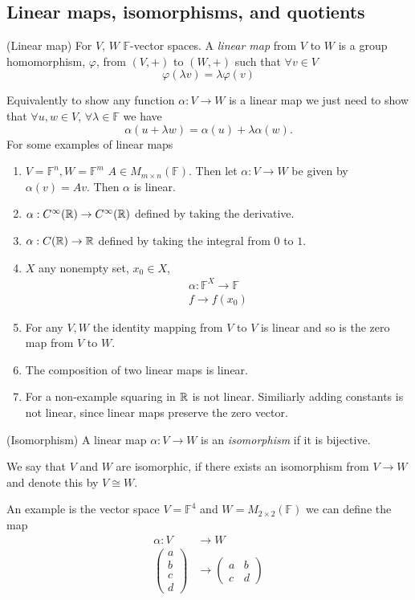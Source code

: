 \documentclass{article}
\newcommand{\F}{\mathbb{F}}
\begin{document}
\subsection{Linear maps, isomorphisms, and quotients}
\begin{definition}
	(Linear map) For $ V $, $ W $ $ \F $-vector spaces. A \textit{linear map} from $ V $ to $ W $ is a group homomorphism, $ \varphi $, from $ (V,+) $ to $ (W,+) $ such that $ \forall v\in V $
	\[
	  \varphi(\lambda v) = \lambda\varphi(v)
	\]
\end{definition}
Equivalently to show any function $\alpha: V\to W $ is a linear map we just need to show that $ \forall u,w\in V $, $ \forall \lambda \in\F $ we have
\[
  \alpha(u+\lambda w)=\alpha(u)+\lambda\alpha(w).
\]
For some examples of linear maps
\begin{enumerate}
	\item $ V=\F^n, W=\F^m $ $ A\in M_{m\times n}(\F) $. Then let $ \alpha:V\to W $ be given by $ \alpha(v)=Av $. Then $ \alpha $ is linear.
	\item $ \alpha:C^\infty(\mathbb{R})\to C^\infty(\mathbb{R}) $ defined by taking the derivative.
	\item $ \alpha: C(\mathbb{R})\to \mathbb{R} $ defined by taking the integral from $ 0 $ to $ 1 $.
	\item $ X $ any nonempty  set, $ x_0\in X $,
		\begin{align*}
		  \alpha:\F^X\to \F \\
		  f\to f(x_0)
		\end{align*}
	\item For any $ V,W $ the identity mapping from $ V $ to $ V $ is linear and so is the zero map from $ V $ to $ W $.
	\item The composition of two linear maps is linear.
	\item For a non-example squaring in $ \mathbb{R} $ is not linear. Similiarly adding constants is not linear, since linear maps preserve the zero vector.
\end{enumerate}
\begin{definition}
	(Isomorphism) A linear map $ \alpha:V\to W $ is an \textit{isomorphism} if it is bijective.\par
	We say that $ V $ and $ W $ are isomorphic, if there exists an isomorphism from $ V\to W $ and denote this by $ V\cong W $.
\end{definition}
An example is the vector space $ V=\F^4 $ and $ W=M_{2\times 2}(\F) $ we can define the map
\begin{align*}
	\alpha:V &\to W\\
	        \begin{pmatrix}
	         a\\b\\c\\d
	       \end{pmatrix}
		 &\to \begin{pmatrix}
		       a & b \\
		       c & d 
	       \end{pmatrix}
\end{align*}
\end{document}
